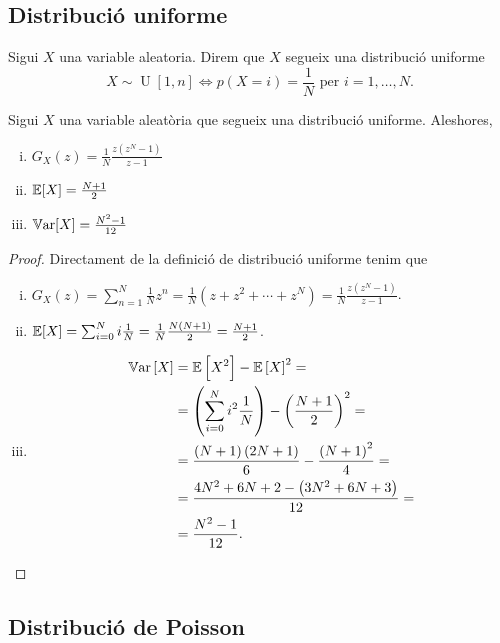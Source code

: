 \subsection*{Distribució uniforme}

\begin{defi}
    Sigui $X$ una variable aleatoria. Direm que $X$ segueix una distribució uniforme
    \[X \sim \operatorname{U}[1,n] \iff p(X=i)=\frac{1}{N} \text{ per } i = 1,\dots,N.\]
\end{defi}

\begin{prop} %
    Sigui $X$ una variable aleatòria que segueix una distribució uniforme. Aleshores,
    \begin{enumerate}[i)]
     \item $G_X(z) =  \frac{1}{N}\frac{z(z^N-1)}{z-1}$
     \item $\operatorname{\mathbb{E}}[X]=\frac{N+1}{2}$
     \item $\operatorname{\mathbb{V}ar}[X]=\frac{N^2-1}{12}$
    \end{enumerate}
\end{prop}

\begin{proof}
    Directament de la definició de distribució uniforme tenim que
    \begin{enumerate}[i)]
        \item $G_X(z) = \sum_{n=1}^N \frac{1}{N}z^n = \frac{1}{N}(z+z^2+\cdots+z^N) = \frac{1}{N}\frac{z(z^N-1)}{z-1}$.
        \item $\operatorname{\mathbb{E}}[X]=\sum_{i=0}^N i\frac{1}{N}=\frac{1}{N}\frac{N\left( N+1\right)}{2}=\frac{N+1}{2}$.
        \item
        \begin{align*}
            \operatorname{\mathbb{V}ar}\left[ X\right] &= \operatorname{\mathbb{E}}\left[ X^2\right] - \operatorname{\mathbb{E}}\left[ X\right] ^2 =\\
            &= \left(\sum_{i=0}^N i^2\frac{1}{N}\right)-\left(\frac{N+1}{2}\right) ^2=\\
            &=\frac{\left( N+1\right) \left( 2N+1\right)}{6}-\frac{\left( N+1\right) ^2}{4} =\\
            &= \frac{4N^2+6N+2-\left( 3N^2+6N+3\right)}{12} =\\
            &=\frac{N^2-1}{12}.
        \end{align*}
  \end{enumerate}
\end{proof}


\subsection*{Distribució de Poisson}

